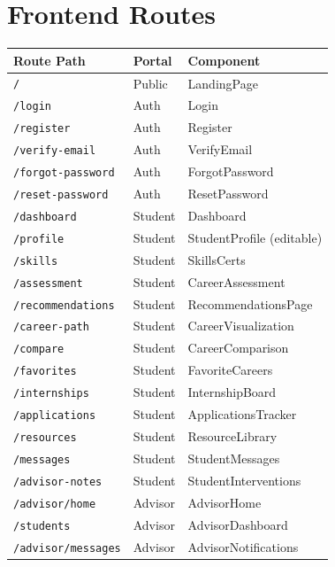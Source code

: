 \documentclass[12pt, a4paper]{article}
\begin{document}
\newpage

\section{Frontend Routes}

\begin{longtable}{p{4.5cm}p{2.5cm}p{7cm}}
\toprule
\textbf{Route Path} & \textbf{Portal} & \textbf{Component} \\
\midrule
\endhead
\texttt{/} & Public & LandingPage \\
\texttt{/login} & Auth & Login \\
\texttt{/register} & Auth & Register \\
\texttt{/verify-email} & Auth & VerifyEmail \\
\texttt{/forgot-password} & Auth & ForgotPassword \\
\texttt{/reset-password} & Auth & ResetPassword \\
\midrule
\texttt{/dashboard} & Student & Dashboard \\
\texttt{/profile} & Student & StudentProfile (editable) \\
\texttt{/skills} & Student & SkillsCerts \\
\texttt{/assessment} & Student & CareerAssessment \\
\texttt{/recommendations} & Student & RecommendationsPage \\
\texttt{/career-path} & Student & CareerVisualization \\
\texttt{/compare} & Student & CareerComparison \\
\texttt{/favorites} & Student & FavoriteCareers \\
\texttt{/internships} & Student & InternshipBoard \\
\texttt{/applications} & Student & ApplicationsTracker \\
\texttt{/resources} & Student & ResourceLibrary \\
\texttt{/messages} & Student & StudentMessages \\
\texttt{/advisor-notes} & Student & StudentInterventions \\
\midrule
\texttt{/advisor/home} & Advisor & AdvisorHome \\
\texttt{/students} & Advisor & AdvisorDashboard \\
\texttt{/advisor/messages} & Advisor & AdvisorNotifications \\

\end{longtable}
\end{document}
